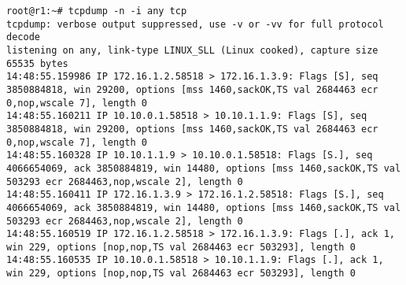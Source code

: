 \documentclass[a4paper,12pt]{article}
\begin{document}
\begin{lstlisting}
root@r1:~# tcpdump -n -i any tcp
tcpdump: verbose output suppressed, use -v or -vv for full protocol decode
listening on any, link-type LINUX_SLL (Linux cooked), capture size 65535 bytes
14:48:55.159986 IP 172.16.1.2.58518 > 172.16.1.3.9: Flags [S], seq 3850884818, win 29200, options [mss 1460,sackOK,TS val 2684463 ecr 0,nop,wscale 7], length 0
14:48:55.160211 IP 10.10.0.1.58518 > 10.10.1.1.9: Flags [S], seq 3850884818, win 29200, options [mss 1460,sackOK,TS val 2684463 ecr 0,nop,wscale 7], length 0
14:48:55.160328 IP 10.10.1.1.9 > 10.10.0.1.58518: Flags [S.], seq 4066654069, ack 3850884819, win 14480, options [mss 1460,sackOK,TS val 503293 ecr 2684463,nop,wscale 2], length 0
14:48:55.160411 IP 172.16.1.3.9 > 172.16.1.2.58518: Flags [S.], seq 4066654069, ack 3850884819, win 14480, options [mss 1460,sackOK,TS val 503293 ecr 2684463,nop,wscale 2], length 0
14:48:55.160519 IP 172.16.1.2.58518 > 172.16.1.3.9: Flags [.], ack 1, win 229, options [nop,nop,TS val 2684463 ecr 503293], length 0
14:48:55.160535 IP 10.10.0.1.58518 > 10.10.1.1.9: Flags [.], ack 1, win 229, options [nop,nop,TS val 2684463 ecr 503293], length 0
\end{lstlisting}
\end{document}
